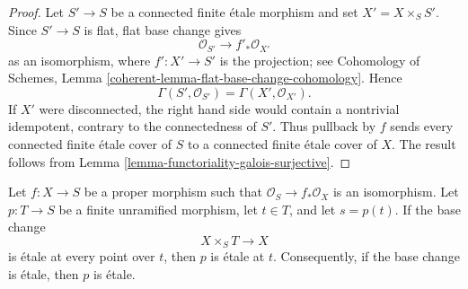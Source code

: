 \begin{proof}
Let $S' \to S$ be a connected finite \'etale morphism and set
$X' = X \times_S S'$. Since $S' \to S$ is flat, flat base change gives
$$
\mathcal{O}_{S'} \longrightarrow f'_*\mathcal{O}_{X'}
$$
as an isomorphism, where $f' : X' \to S'$ is the projection; see
Cohomology of Schemes, Lemma
\ref{coherent-lemma-flat-base-change-cohomology}. Hence
$$
\Gamma(S', \mathcal{O}_{S'}) = \Gamma(X', \mathcal{O}_{X'}).
$$
If $X'$ were disconnected, the right hand side would contain a nontrivial
idempotent, contrary to the connectedness of $S'$. Thus pullback by $f$
sends every connected finite \'etale cover of $S$ to a connected finite
\'etale cover of $X$. The result follows from
Lemma \ref{lemma-functoriality-galois-surjective}.
\end{proof}

\begin{lemma}
\label{lemma-finite-unramified-etale-after-pullback}
Let $f : X \to S$ be a proper morphism such that
$\mathcal{O}_S \to f_*\mathcal{O}_X$ is an isomorphism. Let $p : T \to S$ be
a finite unramified morphism, let $t \in T$, and let $s = p(t)$. If the base
change
$$
X \times_S T \longrightarrow X
$$
is \'etale at every point over $t$, then $p$ is \'etale at $t$.
Consequently, if the base change is \'etale, then $p$ is \'etale.
\end{lemma}

